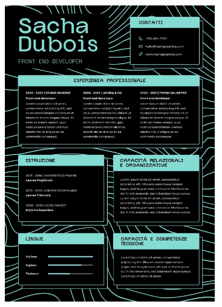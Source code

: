\documentclass[handout]{beamer}
\begin{document}
\begin{frame}
\begin{columns}
\begin{column}{.45\textwidth}
\begin{figure}
      \includegraphics[width=\columnwidth]{img/cv4.png}
    \end{figure}
  \end{column}
\end{columns}
\end{frame}
\end{document}
